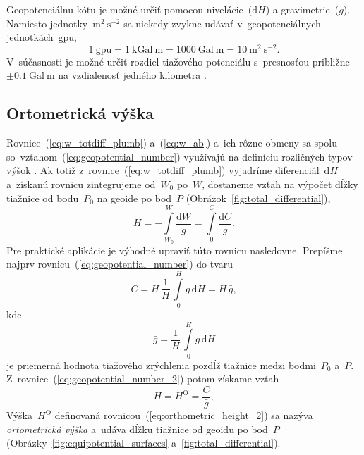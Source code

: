 \documentclass[a4paper, 12pt]{book}
\newcommand{\diff}{\mathrm d}
\begin{document}
Geopotenciálnu kótu je možné určiť pomocou nivelácie~($\diff H$) 
a gravimetrie~($g$).  Namiesto jednotky~$\mathrm{m}^2\ \mathrm{s}^{-2}$ sa 
niekedy zvykne udávať v~geopotenciálnych jednotkách~gpu,
%
\begin{equation}
\label{eq:gpu_unit}
1\ \mathrm{gpu} = 1\ \mathrm{kGal} \ \mathrm{m} = 1000\ \mathrm{Gal}\ 
\mathrm{m} = 10\ \mathrm{m}^2 \ \mathrm{s}^{-2}{.}
\end{equation}
%
V~súčasnosti je možné určiť rozdiel tiažového potenciálu s~presnosťou približne 
$\pm 0.1\ \mathrm{Gal} \ \mathrm{m}$ na vzdialenosť jedného kilometra 
\parencite{MoritzPhysicalGeodesy}.

\subsection{Ortometrická výška}
\label{sec:orthometric_height}

Rovnice~(\ref{eq:w_totdiff_plumb}) a~(\ref{eq:w_ab}) a~ich rôzne obmeny sa 
spolu so~vzťahom~(\ref{eq:geopotential_number}) využívajú na definíciu 
rozličných typov výšok 
\parencite{Jekeli2000a,MoritzPhysicalGeodesy,SansoGeodeticHeights}.  Ak totiž 
z~rovnice~(\ref{eq:w_totdiff_plumb}) vyjadríme diferenciál~$\diff H$ a~získanú 
rovnicu zintegrujeme od~$W_0$ po~$W$, dostaneme vzťah na výpočet dĺžky tiažnice 
od bodu~$P_0$ na geoide po bod~$P$ (Obrázok~\ref{fig:total_differential}),
%
\begin{equation}
\label{eq:orthometric_height_1}
H = -\int\limits_{W_0}^{W} \frac{\diff W}{g} = \int\limits_{0}^{C} \frac{\diff 
C}{g}{.}
\end{equation}
%
Pre praktické aplikácie je výhodné upraviť túto rovnicu nasledovne.  Prepíšme 
najprv rovnicu~(\ref{eq:geopotential_number}) do tvaru 
\parencite{MoritzPhysicalGeodesy}
%
\begin{equation}
\label{eq:geopotential_number_2}
C = H \, \frac{1}{H} \, \int\limits_0^H g \, \diff H = H \, \bar{g}{,}
\end{equation}
%
kde
%
\begin{equation}
\label{eq:mean_g_plumbline}
\bar{g} = \frac{1}{H} \, \int\limits_0^H g \, \diff H
\end{equation}
%
je priemerná hodnota tiažového zrýchlenia pozdĺž tiažnice medzi bodmi~$P_0$ 
a~$P$.  Z~rovnice~(\ref{eq:geopotential_number_2}) potom získame vzťah
%
\begin{equation}
\label{eq:orthometric_height_2}
H = H^\mathrm{O} = \frac{C}{\bar{g}}{,}
\end{equation}
%
Výška~$H^\mathrm{O}$ definovaná rovnicou~(\ref{eq:orthometric_height_2}) sa 
nazýva \emph{ortometrická výška} a~udáva dĺžku tiažnice od geoidu po bod~$P$ 
(Obrázky~\ref{fig:equipotential_surfaces} a~\ref{fig:total_differential}).
\end{document}
